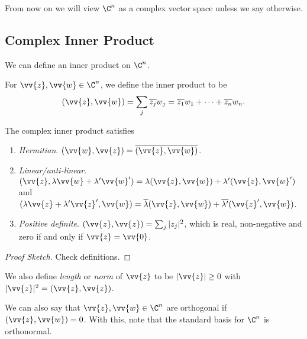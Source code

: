 From now on we will view $\C^n$ as a complex vector space unless we say otherwise.

\subsection{Complex Inner Product}

We can define an inner product on $\C^n$.

\begin{definition}
    For $\vv{z}, \vv{w} \in \C^n$, we define the inner product to be
    $$
    (\vv{z}, \vv{w}) = \sum_j \overline{z_j} w_j = \overline{z_1} w_1 + \cdots + \overline{z_n} w_n.
    $$
\end{definition}

\begin{proposition}
    The complex inner product satisfies
    \begin{enumerate}[label=(\roman*)]
        \item \emph{Hermitian}. $(\vv{w}, \vv{z}) = \overline{(\vv{z}, \vv{w})}$.
        \item \emph{Linear/anti-linear}. $(\vv{z}, \lambda \vv{w}+ \lambda' \vv{w}') = \lambda(\vv{z}, \vv{w}) + \lambda' (\vv{z}, \vv{w}')$ and $(\lambda \vv{z} + \lambda' \vv{z}', \vv{w}) = \overline{\lambda}(\vv{z}, \vv{w}) + \overline{\lambda'} (\vv{z}' , \vv{w})$.
        \item \emph{Positive definite}. $(\vv{z}, \vv{z}) = \sum_j |z_j|^2$, which is real, non-negative and zero if and only if $\vv{z} = \vv{0}$.
    \end{enumerate}
\end{proposition}
\begin{proof}[Proof Sketch]
    Check definitions.
\end{proof}

We also define \emph{length} or \emph{norm} of $\vv{z}$ to be $|\vv{z}| \geq 0$ with $|\vv{z}|^2 = (\vv{z}, \vv{z})$.

We can also say that $\vv{z}, \vv{w} \in \C^n$ are orthogonal if $(\vv{z}, \vv{w}) = 0$. With this, note that the standard basis for $\C^n$ is orthonormal.
